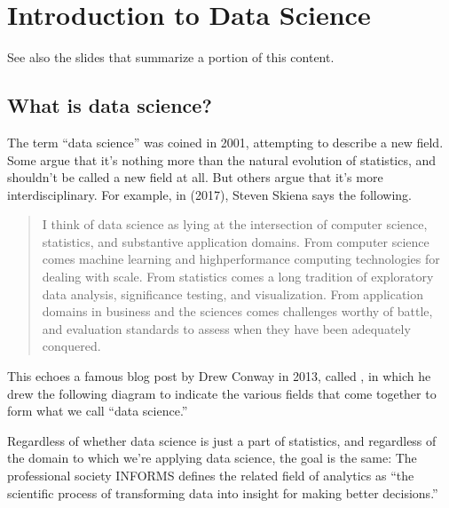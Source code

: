 \documentclass[letterpaper,10pt,english]{sphinxmanual}
\begin{document}
\chapter{Introduction to Data Science}
\label{\detokenize{chapter-1-intro-to-data-science:introduction-to-data-science}}\label{\detokenize{chapter-1-intro-to-data-science::doc}}
See also the slides that summarize a portion of this content.


\section{What is data science?}
\label{\detokenize{chapter-1-intro-to-data-science:what-is-data-science}}
The term “data science” was coined in 2001, attempting to describe a new field.  Some argue that it’s nothing more than the natural evolution of statistics, and shouldn’t be called a new field at all.  But others argue that it’s more interdisciplinary.  For example, in  (2017), Steven Skiena says the following.
\begin{quote}

I think of data science as lying at the intersection of computer science, statistics, and substantive application domains. From computer science comes machine learning and high\sphinxhyphen{}performance computing technologies for dealing with scale. From statistics comes a long tradition of exploratory data analysis, significance testing, and visualization. From application domains in business and the sciences comes challenges worthy of battle, and evaluation standards to assess when they have been adequately conquered.
\end{quote}

This echoes a famous blog post by Drew Conway in 2013, called , in which he drew the following diagram to indicate the various fields that come together to form what we call “data science.”


Regardless of whether data science is just a part of statistics, and regardless of the domain to which we’re applying data science, the goal is the same:   The professional society INFORMS defines the related field of analytics as “the scientific process of transforming data into insight for making better decisions.”
\end{document}
